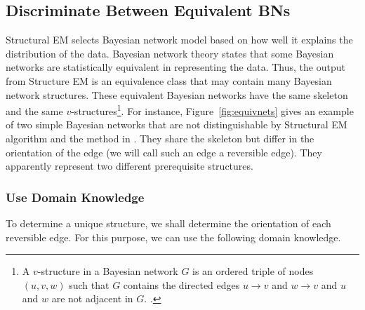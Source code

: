 \documentclass{edm_template}
\begin{document}
\subsection{Discriminate Between Equivalent BNs}
\label{sec:discriminatebns}
Structural EM selects Bayesian network model based on how well it explains the distribution of the data. 
Bayesian network theory states that some Bayesian networks are statistically equivalent in representing the data.
Thus, the output from Structure EM is an equivalence class that may contain many Bayesian network structures.
These equivalent Bayesian networks have the same skeleton and the same $v$-structures\footnote{
A $v$-structure in a Bayesian network $G$ is an ordered triple of nodes $(u,v,w)$ such that $G$ contains the directed edges $u\rightarrow v$ and $w\rightarrow v$ and $u$ and $w$ are not adjacent in $G$. \cite{verma1990equivalence}.}. 
For instance, Figure~\ref{fig:equivnets} gives an example of two simple Bayesian networks that are not distinguishable by Structural EM algorithm and the method in \cite{scheines2014discovering}.
They share the skeleton but differ in the orientation of the edge (we will call such an edge a reversible edge). They apparently represent two different prerequisite structures.

\subsubsection{Use Domain Knowledge}
\label{sec:usedomain}
To determine a unique structure, we shall determine the orientation of each reversible edge.
For this purpose, we can use the following domain knowledge.
\end{document}
